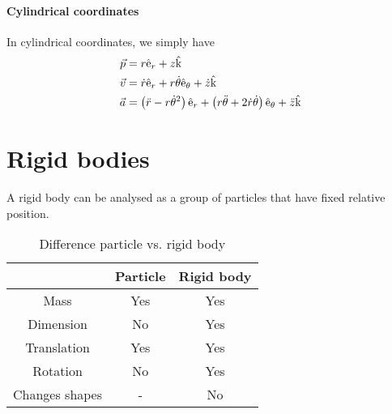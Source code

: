 \documentclass[10pt, twocolumn]{article}
\begin{document}
\paragraph{Cylindrical coordinates}
In cylindrical coordinates, we simply have
\begin{align*}
  \vec{p} & = r\hat{\mathrm{e}}_r + z\hat{\mathrm{k}}                                                                                                                              \\
  \vec{v} & = \dot{r}\hat{\mathrm{e}}_r + r\dot{\theta}\hat{\mathrm{e}}_\theta + \dot{z}\hat{\mathrm{k}}                                                                           \\
  \vec{a} & = \left( \ddot{r} - r\dot{\theta}^2 \right)\hat{\mathrm{e}}_r + \left( r\ddot{\theta} + 2\dot{r}\dot{\theta} \right)\hat{\mathrm{e}}_\theta + \ddot{z}\hat{\mathrm{k}}
\end{align*}


\section{Rigid bodies}
A rigid body can be analysed as a group of particles that have fixed relative position.

\begin{table}[h!] %
  \caption{Difference particle vs. rigid body}
  \begin{center}
    \centering %
    \begin{tabular}{ %
        c|c|c
      }

                     & Particle & Rigid body \\
      \hline
      Mass           & Yes      & Yes        \\
      \hline
      Dimension      & No       & Yes        \\
      \hline
      Translation    & Yes      & Yes        \\
      \hline
      Rotation       & No       & Yes        \\
      \hline
      Changes shapes & -        & No
    \end{tabular}
  \end{center}
\end{table}
\end{document}
